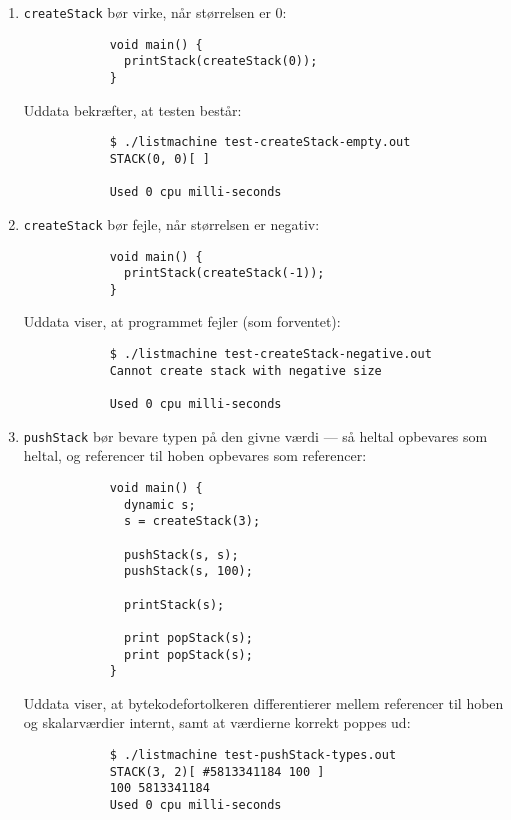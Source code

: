 \begin{enumerate}
    \item \texttt{createStack} bør virke, når størrelsen er 0:
        \begin{verbatim}
            void main() {
              printStack(createStack(0));
            }
        \end{verbatim}
        Uddata bekræfter, at testen består:
        \begin{verbatim}
            $ ./listmachine test-createStack-empty.out
            STACK(0, 0)[ ]

            Used 0 cpu milli-seconds
        \end{verbatim}
    \item \texttt{createStack} bør fejle, når størrelsen er negativ:
        \begin{verbatim}
            void main() {
              printStack(createStack(-1));
            }
        \end{verbatim}
        Uddata viser, at programmet fejler (som forventet):
        \begin{verbatim}
            $ ./listmachine test-createStack-negative.out
            Cannot create stack with negative size

            Used 0 cpu milli-seconds
        \end{verbatim}
    \item \texttt{pushStack} bør bevare typen på den givne værdi --- så heltal opbevares som heltal, og referencer til hoben opbevares som referencer:
        \begin{verbatim}
            void main() {
              dynamic s;
              s = createStack(3);
            
              pushStack(s, s);
              pushStack(s, 100);
            
              printStack(s);
            
              print popStack(s);
              print popStack(s);
            }
        \end{verbatim}
        Uddata viser, at bytekodefortolkeren differentierer mellem referencer til hoben og skalarværdier internt, samt at værdierne korrekt poppes ud:
        \begin{verbatim}
            $ ./listmachine test-pushStack-types.out
            STACK(3, 2)[ #5813341184 100 ]
            100 5813341184
            Used 0 cpu milli-seconds
        \end{verbatim}
    

\end{enumerate}
